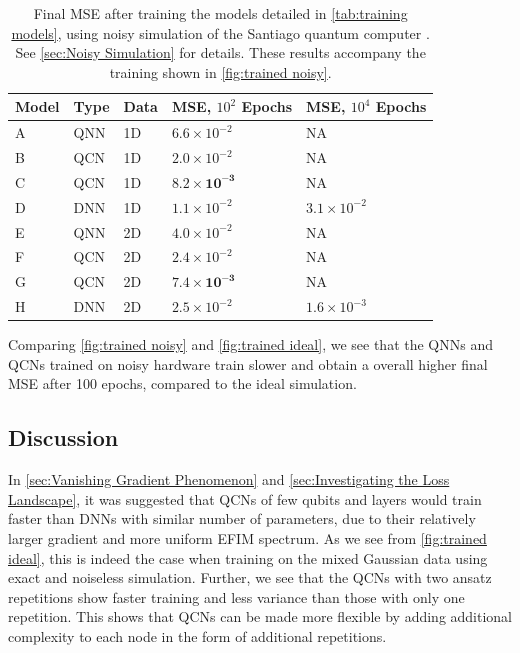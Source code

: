 \begin{table}[H]
\centering
\caption{Final MSE after training the models detailed in \cref{tab:training models}, using noisy simulation of the Santiago quantum computer \cite{santiago}. See \cref{sec:Noisy Simulation} for details. These results accompany the training shown in \cref{fig:trained noisy}.} 
\begin{tabular}{|l|l|l|l|l|}
\hline
Model& Type& Data& MSE, $10^{2}$ Epochs& MSE, $10^{4}$ Epochs \\ \hline
A    & QNN & 1D  & $6.6 \times 10^{-2}$   & NA   \\ \hline
B    & QCN & 1D  & $2.0\times 10^{-2}$  & NA \\ \hline
C    & QCN & 1D  & $\boldsymbol{8.2\times 10^{-3}}$  & NA  \\ \hline
D    & DNN & 1D  & $1.1\times 10^{-2}$ & $3.1\times 10^{-2}$  \\ \Xhline{2\arrayrulewidth}
E    & QNN & 2D  &  $4.0 \times 10^{-2}$                  & NA  \\ \hline
F    & QCN & 2D  &  $2.4\times 10^{-2}$ & NA  \\ \hline
G    & QCN & 2D  &  $\boldsymbol{7.4\times 10^{-3}}$ & NA  \\ \hline
H    & DNN & 2D  &  $2.5\times10^{-2}$ & $1.6\times10^{-3}$\\\hline
\end{tabular}

\label{tab:training models mse noisy}
\end{table}

Comparing \cref{fig:trained noisy} and \cref{fig:trained ideal}, we see that the QNNs and QCNs trained on noisy hardware train slower and obtain a overall higher final MSE after 100 epochs, compared to the ideal simulation. 


\subsection{Discussion}\label{sec:Training Discussion}
In \cref{sec:Vanishing Gradient Phenomenon} and \cref{sec:Investigating the Loss Landscape}, it was suggested that QCNs of few qubits and layers would train faster than DNNs with similar number of parameters, due to their relatively larger gradient and more uniform EFIM spectrum. As we see from \cref{fig:trained ideal}, this is indeed the case when training on the mixed Gaussian data using exact and noiseless simulation.
Further, we see that the QCNs with two ansatz repetitions show faster training and less variance than those with only one repetition. This shows that QCNs can be made more flexible by adding additional complexity to each node in the form of additional repetitions. 

